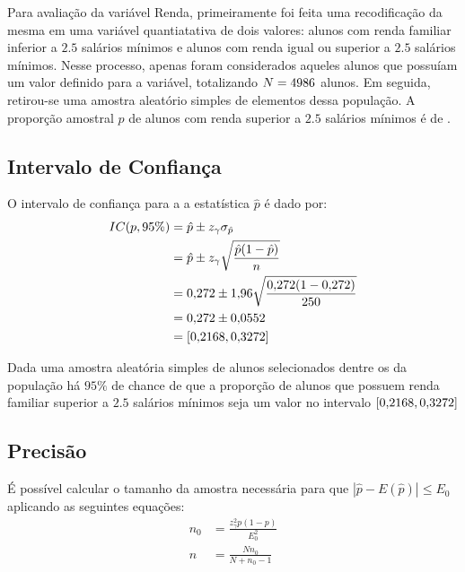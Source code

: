 

Para avaliação da variável Renda, primeiramente foi feita uma recodificação
da mesma em uma variável quantiatativa de dois valores: alunos com renda
familiar inferior a $\num{2,5}$ salários mínimos e alunos com renda igual ou
superior a $\num{2,5}$ salários mínimos. Nesse processo, apenas foram considerados
aqueles alunos que possuíam um valor definido para a variável, totalizando
$N=4986$ alunos. Em seguida, retirou-se uma amostra aleatório simples de
\SEISn elementos dessa população. A proporção amostral $\hat{p}$ de alunos
com renda superior a $\num{2.5}$ salários mínimos é de \SEISpAmostral.

\subsection{Intervalo de Confiança}

	O intervalo de confiança para a a estatística $\hat{p}$ é dado por:
	\begin{align*}
		IC(p, 95\%) &= \hat{p} \pm z_\gamma \sigma_{\hat{p}} \\
					&= \hat{p} \pm z_\gamma \sqrt{\frac{\hat{p}(1-\hat{p})}{n}} \\
					&= \num{0.272} \pm \num{1.96} \sqrt{\frac{\num{0.272} (1- \num{0.272})}{250}} \nonumber \\
					&= \num{0.272} \pm \num{0.0552} \nonumber \\
					&= [\num{0.2168}, \num{0.3272}]
	\end{align*}

	\noindent Dada uma amostra aleatória simples de \SEISn alunos
	selecionados dentre os \SEISN da população há $95\%$ de chance de que a
	proporção de alunos que possuem renda familiar superior a $\num{2,5}$ salários
	mínimos seja um valor no intervalo $[\num{0.2168}, \num{0.3272}]$

\subsection{Precisão}
	
	É possível calcular o tamanho da amostra necessária para que $|\hat{p} -
	E(\hat{p})| \leq E_0$ aplicando as seguintes equações:
	\begin{align}
		n_0 &= \label{eq:seis-b-n0}
			   \frac{z_\gamma^2 p(1-p)}{E_0^2} \\
		n &= \label{eq:seis-b-n}
			 \frac{N n_0}{N + n_0 - 1} 
	\end{align}

